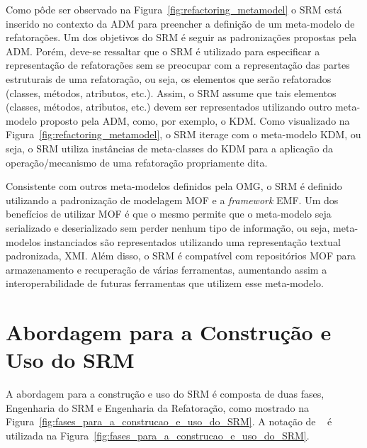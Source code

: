Como pôde ser observado na Figura~\ref{fig:refactoring_metamodel} o SRM está inserido no contexto da ADM para preencher a definição de um meta-modelo de refatorações. Um dos objetivos do SRM é seguir as padronizações propostas pela ADM. Porém, deve-se ressaltar que o SRM é utilizado para especificar a representação de refatorações sem se preocupar com a representação das partes estruturais de uma refatoração, ou seja, os elementos que serão refatorados (classes, métodos, atributos, etc.). Assim, o SRM assume que tais elementos (classes, métodos, atributos, etc.) devem ser representados utilizando outro meta-modelo proposto pela ADM, como, por exemplo, o KDM. Como visualizado na Figura~\ref{fig:refactoring_metamodel}, o SRM iterage com o meta-modelo KDM, ou seja, o SRM utiliza instâncias de meta-classes do KDM para a aplicação da operação/mecanismo de uma refatoração propriamente dita.

Consistente com outros meta-modelos definidos pela OMG, o SRM é definido utilizando a padronização  de modelagem MOF e a \textit{framework} EMF. Um dos benefícios de utilizar MOF é que o mesmo permite que o meta-modelo seja serializado e deserializado sem perder nenhum tipo de informação, ou seja, meta-modelos instanciados são representados utilizando uma representação textual padronizada, XMI. Além disso, o SRM é compatível com repositórios MOF para armazenamento e recuperação de várias ferramentas, aumentando assim a interoperabilidade de futuras ferramentas que utilizem esse meta-modelo.

\section{Abordagem para a Construção e Uso do SRM}\label{abordagem_para_a_construcao_e_uso_do_SRM}

A abordagem para a construção e uso do SRM é composta de duas fases, Engenharia do SRM e Engenharia da Refatoração, como mostrado na Figura~\ref{fig:fases_para_a_construcao_e_uso_do_SRM}. A notação de ~\cite{Marca_1987} é utilizada na Figura~\ref{fig:fases_para_a_construcao_e_uso_do_SRM}.


